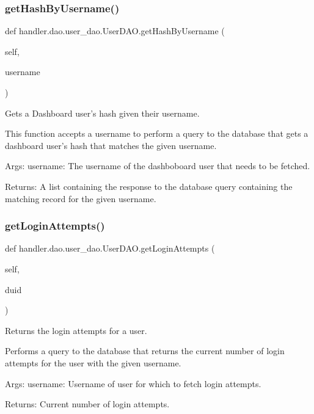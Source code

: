 \subsubsection{\texorpdfstring{get\+Hash\+By\+Username()}{getHashByUsername()}}
{\footnotesize\ttfamily def handler.\+dao.\+user\+\_\+dao.\+User\+D\+A\+O.\+get\+Hash\+By\+Username (\begin{DoxyParamCaption}\item[{}]{self,  }\item[{}]{username }\end{DoxyParamCaption})}

\begin{DoxyVerb}Gets a Dashboard user's hash given their username.

This function accepts a username to perform a query to the database that
gets a dashboard user's hash that matches the given username.

Args:
    username: The username of the dashboboard user that needs to be fetched.

Returns:
    A list containing the response to the database query
    containing the matching record for the given username.
\end{DoxyVerb}
 \mbox{\label{classhandler_1_1dao_1_1user__dao_1_1_user_d_a_o_ac9b514fe18ddd0270ccba0bdbe053da4}} 
\subsubsection{\texorpdfstring{get\+Login\+Attempts()}{getLoginAttempts()}}
{\footnotesize\ttfamily def handler.\+dao.\+user\+\_\+dao.\+User\+D\+A\+O.\+get\+Login\+Attempts (\begin{DoxyParamCaption}\item[{}]{self,  }\item[{}]{duid }\end{DoxyParamCaption})}

\begin{DoxyVerb}Returns the login attempts for a user.

Performs a query to the database that returns the current number 
of login attempts for the user with the given username.

Args:
    username: Username of user for which to fetch login attempts.

Returns:
    Current number of login attempts.
\end{DoxyVerb}
 \mbox{\label{classhandler_1_1dao_1_1user__dao_1_1_user_d_a_o_a7a17e7bf435c7b67263577d6da96bb47}} 
